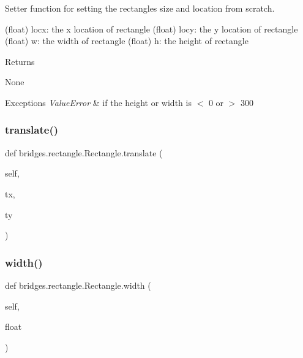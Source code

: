 Setter function for setting the rectangles size and location from scratch. 

(float) locx\+: the x location of rectangle (float) locy\+: the y location of rectangle (float) w\+: the width of rectangle (float) h\+: the height of rectangle \begin{DoxyReturn}{Returns}


None
\end{DoxyReturn}

\begin{DoxyExceptions}{Exceptions}
{\em Value\+Error} & if the height or width is $<$ 0 or $>$ 300 \\
\hline
\end{DoxyExceptions}
\mbox{\label{classbridges_1_1rectangle_1_1_rectangle_aa032816d119516e90a4237cd979a5d41}} 
\subsubsection{\texorpdfstring{translate()}{translate()}}
{\footnotesize\ttfamily def bridges.\+rectangle.\+Rectangle.\+translate (\begin{DoxyParamCaption}\item[{}]{self,  }\item[{}]{tx,  }\item[{}]{ty }\end{DoxyParamCaption})}

\mbox{\label{classbridges_1_1rectangle_1_1_rectangle_a862f1154bb5e73c1811c38e7871f93a5}} 
\subsubsection{\texorpdfstring{width()}{width()}\hspace{0.1cm}{\footnotesize\ttfamily [1/2]}}
{\footnotesize\ttfamily def bridges.\+rectangle.\+Rectangle.\+width (\begin{DoxyParamCaption}\item[{}]{self,  }\item[{}]{float }\end{DoxyParamCaption})}



